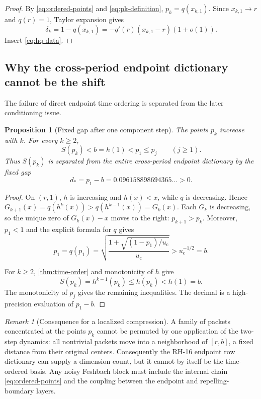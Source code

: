 \documentclass[11pt]{article}
\newtheorem{proposition}[theorem]{Proposition}
\theoremstyle{definition}
\theoremstyle{remark}
\newtheorem{remark}[theorem]{Remark}
\newcommand{\uc}{u_{\mathrm c}}
\begin{document}
\begin{proof}
By \eqref{eq:ordered-points} and \eqref{eq:pk-definition},
$p_k=q(x_{k,1})$.  Since $x_{k,1}\to r$ and $q(r)=1$, Taylor expansion gives
\[
 \delta_k=1-q(x_{k,1})
 =-q'(r)(x_{k,1}-r)(1+o(1)).
\]
Insert \eqref{eq:hq-data}.
\end{proof}

\subsection{Why the cross-period endpoint dictionary cannot be the shift}

The failure of direct endpoint time ordering is separated from the later
conditioning issue.

\begin{proposition}[Fixed gap after one component step]
\label{prop:endpoint-gap}
The points $p_k$ increase with $k$.  For every $k\ge2$,
\begin{equation}\label{eq:endpoint-gap}
 S(p_k)<b=h(1)<p_1\le p_j
 \qquad(j\ge1).
\end{equation}
Thus $S(p_k)$ is separated from the entire cross-period endpoint dictionary
by the fixed gap
\begin{equation}\label{eq:gap-constant}
 d_*=p_1-b=0.096158898694365\ldots>0.
\end{equation}
\end{proposition}

\begin{proof}
On $(r,1)$, $h$ is increasing and $h(x)<x$, while $q$ is decreasing.  Hence
$G_{k+1}(x)=q(h^k(x))>q(h^{k-1}(x))=G_k(x)$.  Each $G_k$ is decreasing, so
the unique zero of $G_k(x)-x$ moves to the right: $p_{k+1}>p_k$.
Moreover, $p_1<1$ and the explicit formula for $q$ gives
\[
 p_1=q(p_1)
 =\sqrt{\frac{1+\sqrt{(1-p_1)/\uc}}{\uc}}
 >\uc^{-1/2}=b.
\]

For $k\ge2$, \cref{thm:time-order} and monotonicity of $h$ give
\[
 S(p_k)=h^{k-1}(p_k)\le h(p_k)<h(1)=b.
\]
The monotonicity of $p_j$ gives the remaining inequalities.  The decimal is
a high-precision evaluation of $p_1-b$.
\end{proof}

\begin{remark}[Consequence for a localized compression]
\label{rem:localized-compression}
A family of packets concentrated at the points $p_k$ cannot be permuted by
one application of the two-step dynamics: all nontrivial packets move into a
neighborhood of $[r,b]$, a fixed distance from their original centers.
Consequently the RH-16 endpoint row dictionary can supply a dimension count,
but it cannot by itself be the time-ordered basis.  Any noisy Feshbach block
must include the internal chain \eqref{eq:ordered-points} and the coupling
between the endpoint and repelling-boundary layers.
\end{remark}
\end{document}
